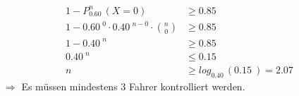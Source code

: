 \begin{Example}{}{}
\begin{enumerate}[label=\alph*),leftmargin=*]
{\begin{align*}
                1 - P_{\SI{0.60}{}}^{n} \left(X = 0\right) &\geq \SI{0.85}{}\\[1.5ex]
                1 - \SI{0.60}{}^{0} \cdot \SI{0.40}{}^{n-0} \cdot \binom{n}{0} &\geq \SI{0.85}{}\\[1.5ex]
                1-\SI{0.40}{}^{n} &\geq \SI{0.85}{}\\[1.5ex]
                \SI{0.40}{}^{n} &\leq \SI{0.15}{}\\[1.5ex]
                n &\geq log_{\SI{0.40}{}} \left(\SI{0.15}{}\right) = \SI{2.07}{}
            \end{align*}
            $\Rightarrow$ Es müssen mindestens 3 Fahrer kontrolliert werden.
            }
    \end{enumerate}
\end{Example}
\pagebreak